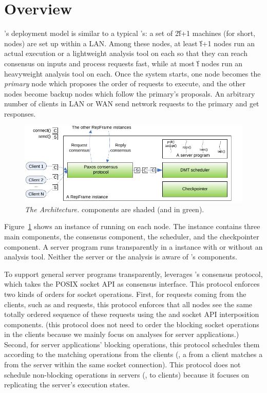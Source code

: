 \section{\xxx Overview} \label{sec:overview}

\xxx's deployment model is similar to a typical \smr's: a set of 2\v{f}+1 
machines (for short, nodes) are set up within a LAN. Among these nodes, at 
least \v{f}+1 nodes run an actual execution or a lightweight analysis tool on 
each so that they can reach consensus on inputs and process requests fast, 
while at most \v{f} nodes run an heavyweight analysis tool on each. Once the 
\xxx system starts, one node becomes the \emph{primary} node which proposes the 
order of requests to execute, and the other nodes become backup nodes which 
follow the primary's proposals. An arbitrary number of clients in LAN or WAN 
send network requests to the primary and get responses.


\begin{figure}[t]
\vspace{.20in}
\centering
\includegraphics[width=.5\textwidth]{figures/arch}
\vspace{-.20in}
\caption{{\em The \xxx Architecture.} \xxx components are shaded (and in
  green).} \label{fig:arch}
\vspace{-.05in}
\end{figure}

Figure~\ref{fig:arch} shows an instance of \xxx running on 
each node. The instance contains three main components, the \paxos consensus 
component, the \dmt scheduler, and the checkpointer component. A server program 
runs transparently in a \xxx instance with or without an analysis tool. Neither 
the server or the analysis is aware of \xxx's components.

To support general server programs transparently, \xxx leverages \repbox's 
\paxos consensus protocol, which takes the POSIX socket API as
consensus interface. This \paxos protocol enforces two kinds of 
orders for socket operations. First, for requests coming from the clients, 
such as \connect and \send requests, this protocol enforces that all nodes see 
the same totally ordered sequence of these requests using the \paxos and socket 
API interposition components.  (this protocol does not need to order the 
blocking socket operations in the clients because we mainly focus on analyses 
for server applications.) Second, for server applications' blocking operations, 
this \paxos protocol schedules them according to the matching operations from 
the clients (\eg, a \send from a client matches a \recv from the server within 
the same socket connection). This protocol does not schedule non-blocking 
operations in servers (\eg, \send to clients) because it focuses on replicating 
the server's execution states.

